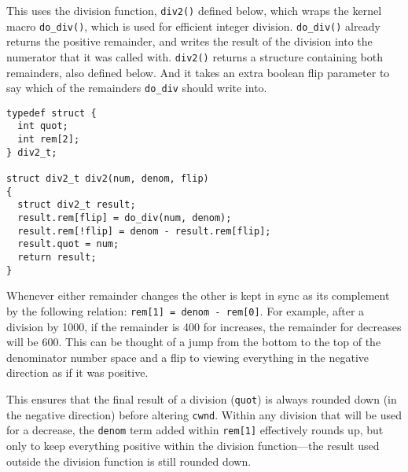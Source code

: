 This uses the division function, \texttt{div2()} defined below, which wraps the
kernel macro \texttt{do\_div()}, which is used for efficient integer division.
\texttt{do\_div()} already returns the positive remainder, and writes the result
of the division into the numerator that it was called with. \texttt{div2()}
returns a structure containing both remainders, also defined below. And it takes
an extra boolean flip parameter to say which of the remainders \texttt{do\_div}
should write into.
\begin{verbatim}
typedef struct {
  int quot;
  int rem[2];
} div2_t;

struct div2_t div2(num, denom, flip)
{
  struct div2_t result;
  result.rem[flip] = do_div(num, denom);
  result.rem[!flip] = denom - result.rem[flip];
  result.quot = num;
  return result;
}
\end{verbatim}

Whenever either remainder changes the other is kept in sync as its complement by
the following relation: \texttt{rem[1] = denom - rem[0]}. For example, after a
division by 1000, if the remainder is 400 for increases, the remainder for
decreases will be 600. This can be thought of a jump from the bottom to the top
of the denominator number space and a flip to viewing everything in the negative
direction as if it was positive.

This ensures that the final result of a division (\texttt{quot}) is always
rounded down (in the negative direction) before altering \texttt{cwnd}. Within
any division that will be used for a decrease, the \texttt{denom} term added
within \texttt{rem[1]} effectively rounds up, but only to keep everything
positive within the division function---the result used outside the division
function is still rounded down.

%

